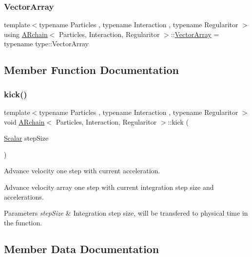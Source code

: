 \subsubsection{\texorpdfstring{Vector\+Array}{VectorArray}}
{\footnotesize\ttfamily template$<$typename Particles , typename Interaction , typename Regularitor $>$ \\
using \mbox{\hyperlink{class_a_rchain}{A\+Rchain}}$<$ Particles, Interaction, Regularitor $>$\+::\mbox{\hyperlink{class_a_rchain_a94de7c4b88207f08c7b517736385d9f2}{Vector\+Array}} =  typename type\+::\+Vector\+Array}



\subsection{Member Function Documentation}
\mbox{\label{class_a_rchain_a2def151c2de7790ebb1696dddac623e3}} 
\subsubsection{\texorpdfstring{kick()}{kick()}}
{\footnotesize\ttfamily template$<$typename Particles , typename Interaction , typename Regularitor $>$ \\
void \mbox{\hyperlink{class_a_rchain}{A\+Rchain}}$<$ Particles, Interaction, Regularitor $>$\+::kick (\begin{DoxyParamCaption}\item[{\mbox{\hyperlink{class_a_rchain_a048c8855064f452c7d6d061531a084ed}{Scalar}}}]{step\+Size }\end{DoxyParamCaption})\hspace{0.3cm}{\ttfamily [inline]}}



Advance velocity one step with current acceleration. 

Advance velocity array one step with current integration step size and accelerations. 
\begin{DoxyParams}{Parameters}
{\em step\+Size} & Integration step size, will be transfered to physical time in the function. \\
\hline
\end{DoxyParams}


\subsection{Member Data Documentation}
\mbox{\label{class_a_rchain_a41e5c73bc46164302db25b5c5d28aedd}} 
